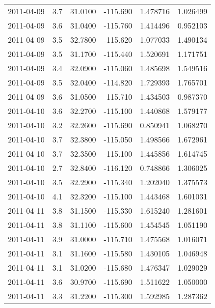 \begin{tabular}{lrrrrr}
2011-04-09 &       3.7 &  31.0100 &  -115.690 &         1.478716 &         1.026499 \\
2011-04-09 &       3.6 &  31.0400 &  -115.760 &         1.414496 &         0.952103 \\
2011-04-09 &       3.5 &  32.7800 &  -115.620 &         1.077033 &         1.490134 \\
2011-04-09 &       3.5 &  31.1700 &  -115.440 &         1.520691 &         1.171751 \\
2011-04-09 &       3.4 &  32.0900 &  -115.060 &         1.485698 &         1.549516 \\
2011-04-09 &       3.5 &  32.0400 &  -114.820 &         1.729393 &         1.765701 \\
2011-04-09 &       3.6 &  31.0500 &  -115.710 &         1.434503 &         0.987370 \\
2011-04-10 &       3.6 &  32.2700 &  -115.100 &         1.440868 &         1.579177 \\
2011-04-10 &       3.2 &  32.2600 &  -115.690 &         0.850941 &         1.068270 \\
2011-04-10 &       3.7 &  32.3800 &  -115.050 &         1.498566 &         1.672961 \\
2011-04-10 &       3.7 &  32.3500 &  -115.100 &         1.445856 &         1.614745 \\
2011-04-10 &       2.7 &  32.8400 &  -116.120 &         0.748866 &         1.306025 \\
2011-04-10 &       3.5 &  32.2900 &  -115.340 &         1.202040 &         1.375573 \\
2011-04-10 &       4.1 &  32.3200 &  -115.100 &         1.443468 &         1.601031 \\
2011-04-11 &       3.8 &  31.1500 &  -115.330 &         1.615240 &         1.281601 \\
2011-04-11 &       3.8 &  31.1100 &  -115.600 &         1.454545 &         1.051190 \\
2011-04-11 &       3.9 &  31.0000 &  -115.710 &         1.475568 &         1.016071 \\
2011-04-11 &       3.1 &  31.1600 &  -115.580 &         1.430105 &         1.046948 \\
2011-04-11 &       3.1 &  31.0200 &  -115.680 &         1.476347 &         1.029029 \\
2011-04-11 &       3.6 &  30.9700 &  -115.690 &         1.511622 &         1.050000 \\
2011-04-11 &       3.3 &  31.2200 &  -115.300 &         1.592985 &         1.287362 \\

\end{tabular}
